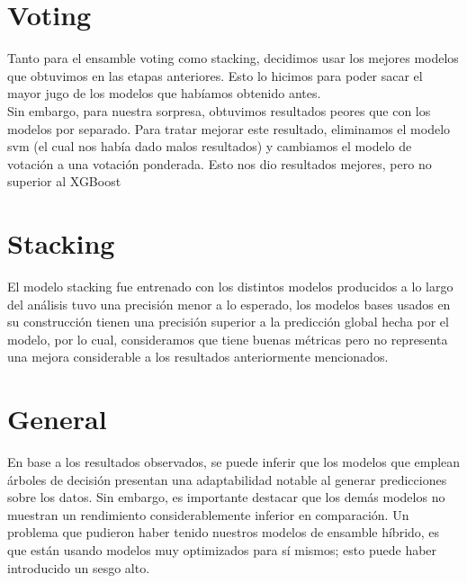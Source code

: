 \documentclass{article}
\begin{document}
\section*{Voting} 
Tanto para el ensamble voting como stacking, decidimos usar los mejores modelos que obtuvimos en las etapas anteriores. Esto lo hicimos para poder sacar el mayor jugo de los modelos que habíamos obtenido antes. \\
Sin embargo, para nuestra sorpresa, obtuvimos resultados peores que con los modelos por separado. Para tratar mejorar este resultado, eliminamos el modelo svm (el cual nos había dado malos resultados) y cambiamos el modelo de votación a una votación ponderada. Esto nos dio resultados mejores, pero no superior al XGBoost


\section*{Stacking} 
El modelo stacking fue entrenado con los distintos modelos producidos a lo largo del análisis tuvo una precisión menor a lo esperado, los modelos bases usados en su construcción tienen una precisión superior a la predicción global hecha por el modelo, por lo cual, consideramos que tiene buenas métricas pero no representa una mejora considerable a los resultados anteriormente mencionados.

\section*{General} 
En base a los resultados observados, se puede inferir que los modelos que emplean árboles de decisión presentan una adaptabilidad notable al generar predicciones sobre los datos. Sin embargo, es importante destacar que los demás modelos no muestran un rendimiento considerablemente inferior en comparación. Un problema que pudieron haber tenido nuestros modelos de ensamble híbrido, es que están usando modelos muy optimizados para sí mismos; esto puede haber introducido un sesgo alto. 
\end{document}
